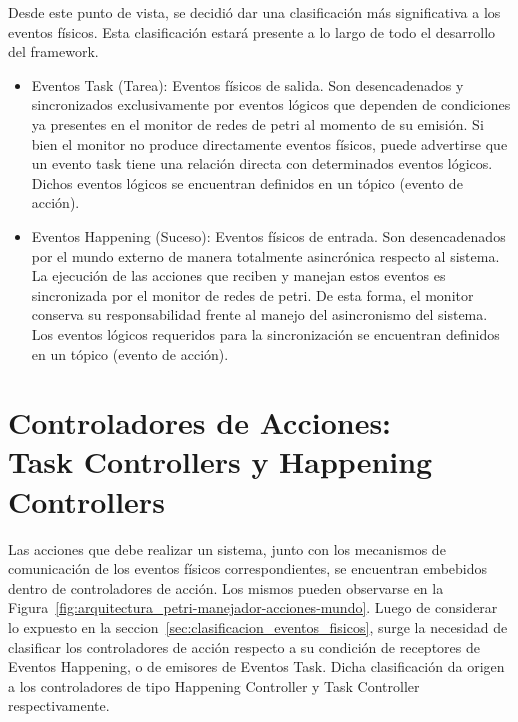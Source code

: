 Desde este punto de vista, se decidió dar una clasificación más significativa a
los eventos físicos. Esta clasificación estará presente a lo largo de todo
el desarrollo del framework.
\begin{itemize}
  \item Eventos Task (Tarea): Eventos físicos de salida. Son
  desencadenados y sincronizados exclusivamente por eventos lógicos que dependen
  de condiciones ya presentes en el monitor de redes de petri al momento de su
  emisión. Si bien el monitor no produce directamente eventos físicos, puede
  advertirse que un evento task tiene una relación directa con determinados
  eventos lógicos. Dichos eventos lógicos se encuentran definidos en un tópico
  (evento de acción).
  \item Eventos Happening (Suceso): Eventos físicos de entrada. Son
  desencadenados por el mundo externo de manera totalmente asincrónica respecto
  al sistema. La ejecución de las acciones que reciben y manejan estos eventos
  es sincronizada por el monitor de redes de petri. De esta forma, el monitor
  conserva su responsabilidad frente al manejo del asincronismo del sistema.
  Los eventos lógicos requeridos para la sincronización se encuentran definidos
  en un tópico (evento de acción).
\end{itemize}

\section{Controladores de Acciones: \\ Task Controllers y Happening Controllers}
\label{sec:controladores_de_acciones}
Las acciones que debe realizar un sistema, junto con los mecanismos de
comunicación de los eventos físicos correspondientes, se encuentran embebidos
dentro de controladores de acción. Los mismos pueden observarse en la
Figura~\ref{fig:arquitectura_petri-manejador-acciones-mundo}. 
Luego de considerar lo expuesto en la
seccion~\ref{sec:clasificacion_eventos_fisicos}, surge la necesidad de
clasificar los controladores de acción respecto a su condición de receptores de
Eventos Happening, o de emisores de Eventos Task. Dicha clasificación
da origen a los controladores de tipo Happening Controller y Task
Controller respectivamente.

